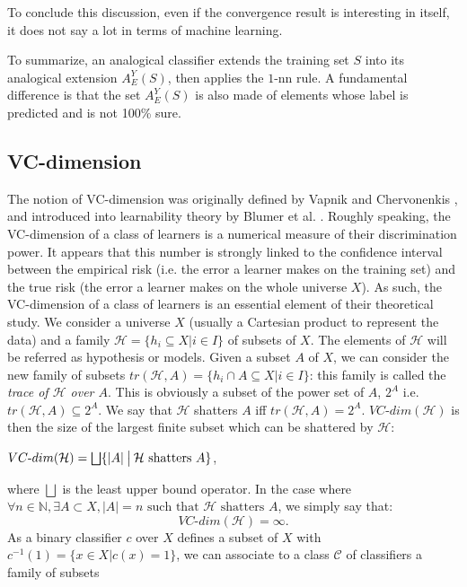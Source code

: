 \begin{enumerate}
\end{enumerate}
To conclude this discussion, even if the convergence result is interesting in
itself, it does not say a lot in terms of machine learning.

To summarize, an analogical classifier extends the training set $S$ into its
analogical extension $A_E^Y(S)$, then applies the $1\mbox{-nn}$ rule. A
fundamental difference is that the set $A_E^Y(S)$ is also made of elements
whose label is predicted and is not 100\% sure.

\subsection{VC-dimension}\label{vcdim}
The notion of VC-dimension was originally defined by Vapnik and Chervonenkis
\cite{Vap98}, and introduced into learnability theory by Blumer et al.
\cite{BluEhrHauWarACM89}. Roughly speaking, the VC-dimension of a class of learners is a numerical measure of their discrimination power. It appears that this number is strongly linked to the confidence interval between the empirical risk (i.e. the error a learner makes on the training set) and the true risk (the error a learner makes on the whole universe $X$). As such, the VC-dimension of a class of learners is an essential element of their theoretical study.
We consider a universe $X$ (usually a Cartesian product to represent the data) and a
family $\mathcal{H}=\{h_i \subseteq X|i \in I\}$ of subsets of $X$.
The elements of $\mathcal{H}$ will be referred as hypothesis or models.
Given a subset $A$
of $X$, we can consider the new family of subsets $tr(\mathcal{H},A) = \{h_i \cap A \subseteq X|i \in I\}$: this family is called the {\it trace of $\mathcal{H}$ over $A$}. This is obviously a subset
of the power set of $A$, $2^A$ i.e. $tr(\mathcal{H},A) \subseteq 2^A$.
We say that $\mathcal{H}$ shatters $A$ iff $tr(\mathcal{H},A)=2^A$.
$VC\mbox{-}dim(\mathcal{H})$ is then the size of the largest finite subset which can be shattered by $\mathcal{H}$:
\begin{definition}
  $VC\mbox{-}dim(\mathcal{H}) = \bigsqcup \{|A| \given[\big] \mathcal{H} \mbox{ shatters } A
\}$,
\end{definition}
where $\bigsqcup$ is the least upper bound operator.
In the case where $\forall n \in\mathbb{N}, \exists  A \subset X, |A|=n \mbox{ such
that } \mathcal{H} \mbox{ shatters } A$, we simply say that:
$$VC\mbox{-}dim(\mathcal{H})=\infty.$$
\noindent
As a binary classifier $c$ over $X$ defines a subset of $X$ with $c^{-1}(1)=\{x \in X | c(x)=1\}$, we can associate to a class $\mathcal{C}$ of classifiers a family of subsets
